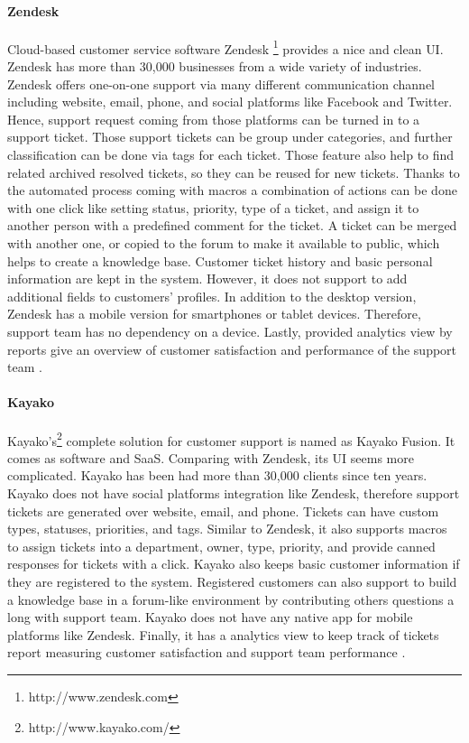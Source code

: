 \paragraph{Zendesk}
Cloud-based customer service software Zendesk \footnote{http://www.zendesk.com} provides a nice and clean \ac{UI}. Zendesk has more than 30,000 businesses from a wide variety of industries. Zendesk offers one-on-one support via many different communication channel including website, email, phone, and social platforms like Facebook and Twitter. Hence, support request coming from those platforms can be turned in to a support ticket. Those support tickets can be group under categories, and further classification can be done via tags for each ticket. Those feature also help to find related archived resolved tickets, so they can be reused for new tickets. Thanks to the automated process coming with macros a combination of actions can be done with one click like setting status, priority, type of a ticket, and assign it to another person with a predefined comment for the ticket. A ticket can be merged with another one, or copied to the forum to make it available to public, which helps to create a knowledge base. Customer ticket history and basic personal information are kept in the system. However, it does not support to add additional fields to customers' profiles. In addition to the desktop version, Zendesk has a mobile version for smartphones or tablet devices. Therefore, support team has no dependency on a device. Lastly, provided analytics view by reports give an overview of customer satisfaction and performance of the support team \citep{Zendesk2013,Zendesk2013a}.

\paragraph{Kayako}
Kayako's\footnote{http://www.kayako.com/} complete solution for customer support is named as Kayako Fusion. It comes as software and \ac{SaaS}. Comparing with Zendesk, its \ac{UI} seems more complicated. Kayako has been had more than 30,000 clients since ten years. Kayako does not have social platforms integration like Zendesk, therefore support tickets are generated over website, email, and phone. Tickets can have custom types, statuses, priorities, and tags. Similar to Zendesk, it also supports macros to assign tickets into a department, owner, type, priority, and provide canned responses for tickets with a click. Kayako also keeps basic customer information if they are registered to the system. Registered customers can also support to build a knowledge base in a forum-like environment by contributing others questions a long with support team. Kayako does not have any native app for mobile platforms like Zendesk. Finally, it has a analytics view to keep track of tickets report measuring customer satisfaction and support team performance \citep{KayakoInc.2013,KayakoInc.2013a}.

